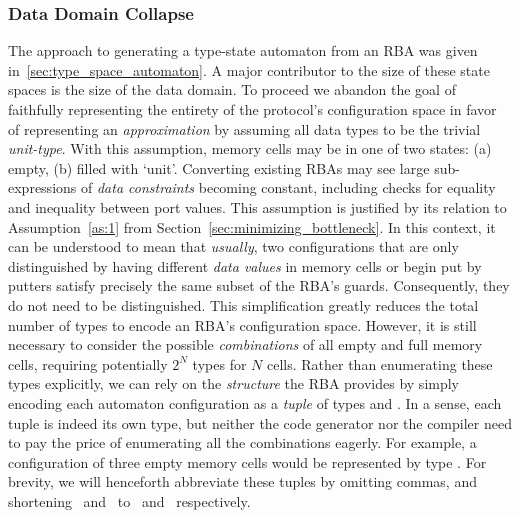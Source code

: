 \subsubsection{Data Domain Collapse}
\label{sec:approximating_rba}
The approach to generating a type-state automaton from an RBA was given in~\ref{sec:type_space_automaton}. A major contributor to the size of these state spaces is the size of the data domain. To proceed we abandon the goal of faithfully representing the entirety of the protocol's configuration space in favor of representing an \textit{approximation} by assuming all data types to be the trivial \textit{unit-type}. With this assumption, memory cells may be in one of two states: (a) empty, (b) filled with `unit'. Converting existing RBAs may see large sub-expressions of \textit{data constraints} becoming constant, including checks for equality and inequality between port values. This assumption is justified by its relation to Assumption~\ref{as:1} from Section~\ref{sec:minimizing_bottleneck}. In this context, it can be understood to mean that \textit{usually}, two configurations that are only distinguished by having different \textit{data values} in memory cells or begin put by putters satisfy precisely the same subset of the RBA's guards. Consequently, they do not need to be distinguished. This simplification greatly reduces the total number of types to encode an RBA's configuration space. However, it is still necessary to consider the possible \textit{combinations} of all empty and full memory cells, requiring potentially $2^N$ types for $N$ cells. Rather than enumerating these types explicitly, we can rely on the \textit{structure} the RBA provides by simply encoding each automaton configuration as a \textit{tuple} of types  and . In a sense, each tuple is indeed its own type, but neither the code generator nor the compiler need to pay the price of enumerating all the combinations eagerly. For example, a configuration of three empty memory cells would be represented by type . For brevity, we will henceforth abbreviate these tuples by omitting commas, and shortening~ and~ to~ and~ respectively.


